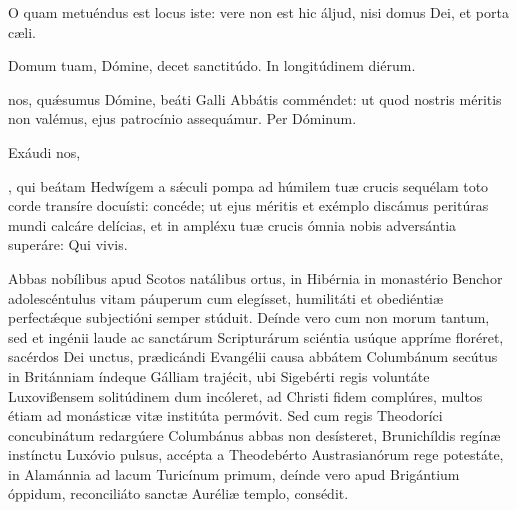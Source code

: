 \documentclass[fontsize=9pt,paper=A6,twoside,BCOR=1mm,DIV=22,headinclude]{scrarticle}
\begin{document}
\begin{multicols}{2}

\A O quam metuéndus est locus iste: vere non est hic áljud, nisi domus Dei, et porta cæli.

\V Domum tuam, Dómine, decet sanctitúdo.
\R In longitúdinem diérum.




\VRCi 

\MiC

 nos, qu\'æsumus Dómine, beáti Galli Abbátis comméndet: ut quod nostris méritis non valémus, ejus patrocínio assequámur. Per Dóminum.


\AiiiV 

\VRViii 

 Exáudi nos, 


\AiNV

\VRNVi

, qui beátam Hedwígem a sǽculi pompa ad húmilem tuæ crucis sequélam toto corde transíre docuísti: concéde; ut ejus méritis et exémplo discámus peritúras mundi calcáre delícias, et in ampléxu tuæ crucis ómnia nobis adversántia superáre: Qui vivis.

\columnbreak
{}
 Abbas nobílibus apud Scotos natálibus ortus, in Hibérnia in monastério Benchor adolescéntulus vitam páuperum cum elegísset, humilitáti et obediéntiæ perfect\'æque subjectióni semper stúduit. Deínde vero cum non morum tantum, sed et ingénii laude ac sanctárum Scripturárum sciéntia usúque appríme floréret, sacérdos Dei unctus, prædicándi Evangélii causa abbátem Columbánum secútus in Británniam índeque Gálliam trajécit, ubi Sigebérti regis voluntáte Luxovißensem solitúdinem dum incóleret, ad Christi fidem complúres, multos étiam ad monásticæ vitæ institúta permóvit. Sed cum regis Theodoríci concubinátum redargúere Columbánus abbas non desísteret, Brunichíldis regínæ instínctu Luxóvio pulsus, accépta a Theodebérto Austrasianórum rege potestáte, in Alamánnia ad lacum Turicínum primum, deínde vero apud Brigántium óppidum, reconciliáto sanctæ Auréliæ templo, consédit.

\RVCiv


\end{multicols}
\end{document}
